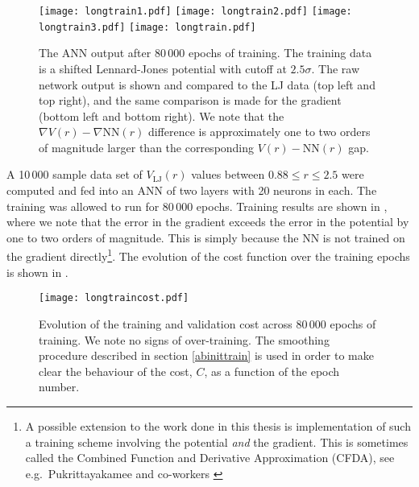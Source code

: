 \documentclass[../../master.tex]{subfiles}
\begin{document}
\begin{figure}
\centering
\texttt{[image: longtrain1.pdf]}
\texttt{[image: longtrain2.pdf]}
\texttt{[image: longtrain3.pdf]}
\texttt{[image: longtrain.pdf]}
\caption{The ANN output after 80\,000 epochs of training. The training data is a shifted Lennard-Jones potential with cutoff at $2.5\sigma$. The raw network output is shown and compared to the LJ data (top left and top right), and the same comparison is made for the gradient (bottom left and bottom right). We note that the $\nabla V(r)-\nabla \text{NN}(r)$ difference is approximately one to two orders of magnitude larger than the corresponding $V(r)-\text{NN}(r)$ gap.  \label{fig:longtrain}}
\end{figure}

A 10\,000 sample data set of $V_\text{LJ}(r)$ values between $0.88\le r \le 2.5$ were computed and fed into an ANN of two layers with 20 neurons in each. The training was allowed to run for 80\,000 epochs. Training results are shown in , where we note that the error in the gradient exceeds the error in the potential by one to two orders of magnitude. This is simply because the NN is not trained on the gradient directly\footnote{A possible extension to the work done in this thesis is implementation of such a training scheme involving the potential \emph{and} the gradient. This is sometimes called the Combined Function and Derivative Approximation (CFDA), see e.g.\ Pukrittayakamee and co-workers \cite{pukrittayakamee2009simultaneous}}. The evolution of the cost function over the training epochs is shown in . 

\begin{SCfigure}
\centering
\texttt{[image: longtraincost.pdf]}
\caption{Evolution of the training and validation cost across 80\,000 epochs of training. We note no signs of over-training. The smoothing procedure described in section \ref{abinittrain} is used in order to make clear the behaviour of the cost, $C$, as a function of the epoch number. \label{fig:longtrainmeta}}
\end{SCfigure}
\end{document}
